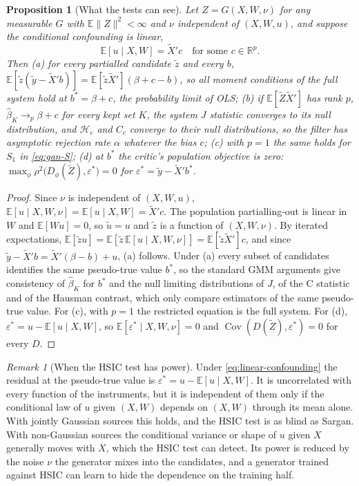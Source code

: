 \documentclass[11pt]{article}
\newtheorem{proposition}{Proposition}
\theoremstyle{definition}
\theoremstyle{remark}
\newtheorem{remark}{Remark}
\newcommand{\E}{\mathbb{E}}
\newcommand{\Cov}{\operatorname{Cov}}
\begin{document}
\begin{proposition}[What the tests can see]\label{prop:gan}
Let $Z=G(X,W,\nu)$ for any measurable $G$ with $\E\|Z\|^2<\infty$ and $\nu$ independent of
$(X,W,u)$, and suppose the conditional confounding is linear,
\begin{equation}\label{eq:linear-confounding}
  \E[u\mid X,W] = \tilde X'c\quad\text{for some } c\in\mathbb{R}^p .
\end{equation}
Then (a) for every partialled candidate $\tilde z$ and every $b$,
$\E[\tilde z(\tilde y-\tilde X'b)] = \E[\tilde z\tilde X'](\beta+c-b)$, so all moment conditions of the full system
hold at $b^\ast=\beta+c$, the probability limit of OLS; (b) if $\E[\tilde Z\tilde X']$ has rank $p$,
$\hat\beta_K\to_p\beta+c$ for every kept set $K$, the system $J$ statistic converges to its null
distribution, and $\mathcal{H}_c$ and $C_c$ converge to their null distributions, so the filter has
asymptotic rejection rate $\alpha$ whatever the bias $c$; (c) with $p=1$ the same holds for
$S_1$ in \eqref{eq:gan-S}; (d) at $b^\ast$ the critic's population objective is zero:
$\max_\phi\rho^2\big(D_\phi(\tilde Z),\varepsilon^\ast\big)=0$ for
$\varepsilon^\ast=\tilde y-\tilde X'b^\ast$.
\end{proposition}

\begin{proof}
Since $\nu$ is independent of $(X,W,u)$, $\E[u\mid X,W,\nu]=\E[u\mid X,W]=\tilde X'c$. The
population partialling-out is linear in $W$ and $\E[Wu]=0$, so $\tilde u=u$ and $\tilde z$ is a
function of $(X,W,\nu)$. By iterated expectations,
$\E[\tilde z u]=\E[\tilde z\,\E[u\mid X,W,\nu]]=\E[\tilde z\tilde X']c$, and since
$\tilde y - \tilde X'b = \tilde X'(\beta-b)+u$, (a) follows. Under (a) every subset of candidates identifies the same pseudo-true
value $b^\ast$, so the standard GMM arguments give consistency of $\hat\beta_K$ for $b^\ast$ and the
null limiting distributions of $J$, of the C statistic and of the Hausman contrast, which only
compare estimators of the same pseudo-true value. For (c), with $p=1$ the restricted equation is the
full system. For (d), $\varepsilon^\ast = u - \E[u\mid X,W]$, so
$\E[\varepsilon^\ast\mid X,W,\nu]=0$ and $\Cov(D(\tilde Z),\varepsilon^\ast)=0$ for every $D$.
\end{proof}

\begin{remark}[When the HSIC test has power]\label{rem:hsic}
Under \eqref{eq:linear-confounding} the residual at the pseudo-true value is
$\varepsilon^\ast = u - \E[u\mid X,W]$. It is uncorrelated with every function of the instruments,
but it is independent of them only if the conditional law of $u$ given $(X,W)$ depends on $(X,W)$
through its mean alone. With jointly Gaussian sources this holds, and the HSIC test is as blind as
Sargan. With non-Gaussian sources the conditional variance or shape of $u$ given $X$ generally
moves with $X$, which the HSIC test can detect. Its power is reduced by the noise $\nu$ the generator
mixes into the candidates, and a generator trained against HSIC can learn to hide the dependence on
the training half.
\end{remark}
\end{document}

